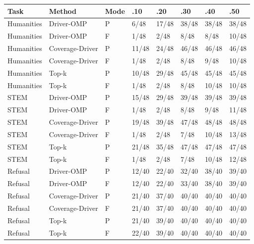 \begin{tabular}{llllllll}
\toprule
Task & Method & Mode & .10 & .20 & .30 & .40 & .50 \\
\midrule
Humanities & Driver-OMP & P & 6/48 & 17/48 & 38/48 & 38/48 & 38/48 \\
Humanities & Driver-OMP & F & 1/48 & 2/48 & 8/48 & 8/48 & 10/48 \\
Humanities & Coverage-Driver & P & 11/48 & 24/48 & 46/48 & 46/48 & 46/48 \\
Humanities & Coverage-Driver & F & 1/48 & 2/48 & 8/48 & 9/48 & 10/48 \\
Humanities & Top-k & P & 10/48 & 29/48 & 45/48 & 45/48 & 45/48 \\
Humanities & Top-k & F & 1/48 & 2/48 & 8/48 & 10/48 & 10/48 \\
STEM & Driver-OMP & P & 15/48 & 29/48 & 39/48 & 39/48 & 39/48 \\
STEM & Driver-OMP & F & 1/48 & 2/48 & 8/48 & 9/48 & 11/48 \\
STEM & Coverage-Driver & P & 19/48 & 39/48 & 47/48 & 48/48 & 48/48 \\
STEM & Coverage-Driver & F & 1/48 & 2/48 & 7/48 & 10/48 & 13/48 \\
STEM & Top-k & P & 21/48 & 35/48 & 47/48 & 47/48 & 47/48 \\
STEM & Top-k & F & 1/48 & 2/48 & 7/48 & 10/48 & 12/48 \\
Refusal & Driver-OMP & P & 12/40 & 22/40 & 32/40 & 38/40 & 39/40 \\
Refusal & Driver-OMP & F & 12/40 & 22/40 & 33/40 & 38/40 & 39/40 \\
Refusal & Coverage-Driver & P & 21/40 & 37/40 & 40/40 & 40/40 & 40/40 \\
Refusal & Coverage-Driver & F & 21/40 & 37/40 & 40/40 & 40/40 & 40/40 \\
Refusal & Top-k & P & 21/40 & 39/40 & 40/40 & 40/40 & 40/40 \\
Refusal & Top-k & F & 22/40 & 39/40 & 40/40 & 40/40 & 40/40 \\
\bottomrule
\end{tabular}
